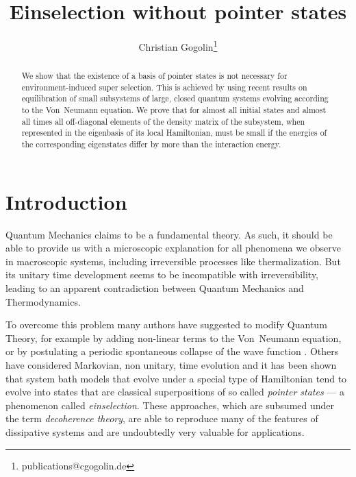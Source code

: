 \documentclass[aps,prl,twocolumn,showpacs,showkeys,a4paper]{revtex4}
\begin{document}
\title{Einselection without pointer states}
\author{Christian Gogolin\footnote{publications@cgogolin.de}}

\begin{abstract}
  We show that the existence of a basis of pointer states is not necessary for environment-induced super selection.
  This is achieved by using recent results on equilibration of small subsystems of large, closed quantum systems evolving according to the Von~Neumann equation.
  We prove that for almost all initial states and almost all times all off-diagonal elements of the density matrix of the subsystem, when represented in the eigenbasis of its local Hamiltonian, must be small if the energies of the corresponding eigenstates differ by more than the interaction energy.
\end{abstract}


\maketitle


\section{Introduction}
\label{sec:introduction}
%
Quantum Mechanics claims to be a fundamental theory.
As such, it should be able to provide us with a microscopic explanation for all phenomena we observe in macroscopic systems, including irreversible processes like thermalization.
But its unitary time development seems to be incompatible with irreversibility, leading to an apparent contradiction between Quantum Mechanics and Thermodynamics.

To overcome this problem many authors have suggested to modify Quantum Theory, for example by adding non-linear terms to the Von~Neumann equation, or by postulating a periodic spontaneous collapse of the wave function \cite{Bassi03}.
Others have considered Markovian, non unitary, time evolution \cite{Breuer02} and it has been shown that system bath models that evolve under a special type of Hamiltonian tend to evolve into states that are classical superpositions of so called \emph{pointer states} \cite{RevModPhys.75.715} --- a phenomenon called \emph{einselection}.
These approaches, which are subsumed under the term \emph{decoherence theory}, are able to reproduce many of the features of dissipative systems and are undoubtedly very valuable for applications.
\end{document}
